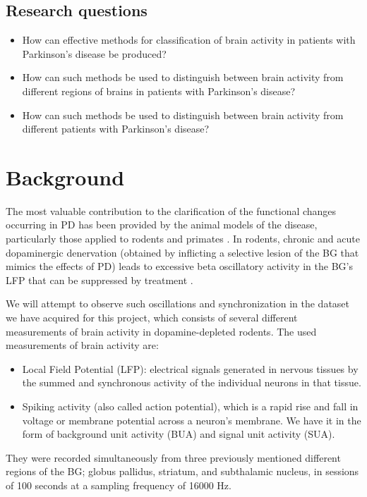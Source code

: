 \documentclass{article}
\begin{document}
\subsection{Research questions}

\begin{itemize}
    \item How can effective methods for classification of brain activity in patients with Parkinson's disease be produced?
    \item How can such methods be used to distinguish between brain activity from different regions of brains in patients with Parkinson's disease?
    \item How can such methods be used to distinguish between brain activity from different patients with Parkinson's disease?
\end{itemize}

\newpage
\section{Background}

The most valuable contribution to the clarification of the functional changes occurring in PD has been provided by the animal models of the disease, particularly those applied to rodents and primates \citep{Mallet}. 
In rodents, chronic and acute dopaminergic denervation (obtained by inflicting a selective lesion of the BG that mimics the effects of PD) leads to excessive beta oscillatory activity in the BG's LFP that can be suppressed by treatment \citep{Mallet}.

We will attempt to observe such oscillations and synchronization in the dataset we have acquired for this project, which consists of several different measurements of brain activity in dopamine-depleted rodents. 
The used measurements of brain activity are:

\begin{itemize}
    \item Local Field Potential (LFP): electrical signals generated in nervous tissues by the summed and synchronous activity of the individual neurons in that tissue.
    \item Spiking activity (also called action potential), which is a rapid rise and fall in voltage or membrane potential across a neuron's membrane. We have it in the form of background unit activity (BUA) and signal unit activity (SUA).
\end{itemize}

They were recorded simultaneously from three previously mentioned different regions of the BG; globus pallidus, striatum, and subthalamic nucleus, in sessions of 100 seconds at a sampling frequency of 16000 Hz.
\end{document}
